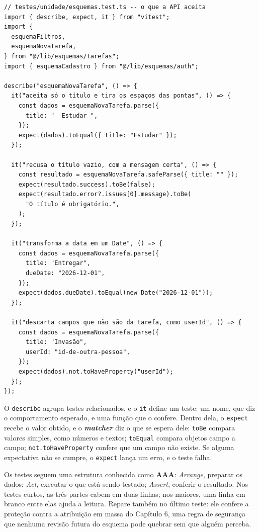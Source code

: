 \begin{codigo}
\begin{Verbatim}[breaklines=true, breaksymbolleft={}, fontsize=\footnotesize]
// testes/unidade/esquemas.test.ts -- o que a API aceita
import { describe, expect, it } from "vitest";
import {
  esquemaFiltros,
  esquemaNovaTarefa,
} from "@/lib/esquemas/tarefas";
import { esquemaCadastro } from "@/lib/esquemas/auth";

describe("esquemaNovaTarefa", () => {
  it("aceita só o título e tira os espaços das pontas", () => {
    const dados = esquemaNovaTarefa.parse({
      title: "  Estudar ",
    });
    expect(dados).toEqual({ title: "Estudar" });
  });

  it("recusa o título vazio, com a mensagem certa", () => {
    const resultado = esquemaNovaTarefa.safeParse({ title: "" });
    expect(resultado.success).toBe(false);
    expect(resultado.error?.issues[0].message).toBe(
      "O título é obrigatório.",
    );
  });

  it("transforma a data em um Date", () => {
    const dados = esquemaNovaTarefa.parse({
      title: "Entregar",
      dueDate: "2026-12-01",
    });
    expect(dados.dueDate).toEqual(new Date("2026-12-01"));
  });

  it("descarta campos que não são da tarefa, como userId", () => {
    const dados = esquemaNovaTarefa.parse({
      title: "Invasão",
      userId: "id-de-outra-pessoa",
    });
    expect(dados).not.toHaveProperty("userId");
  });
});
\end{Verbatim}
\end{codigo}

O \texttt{describe} agrupa testes relacionados, e o \texttt{it} define um teste: um nome, que diz o comportamento esperado, e uma função que o confere. Dentro dela, o \texttt{expect} recebe o valor obtido, e o \textbf{\textit{matcher}} diz o que se espera dele: \texttt{toBe} compara valores simples, como números e textos; \texttt{toEqual} compara objetos campo a campo; \texttt{not.toHaveProperty} confere que um campo não existe. Se alguma expectativa não se cumpre, o \texttt{expect} lança um erro, e o teste falha.

Os testes seguem uma estrutura conhecida como \textbf{AAA}: \textit{Arrange}, preparar os dados; \textit{Act}, executar o que está sendo testado; \textit{Assert}, conferir o resultado. Nos testes curtos, as três partes cabem em duas linhas; nos maiores, uma linha em branco entre elas ajuda a leitura. Repare também no último teste: ele confere a proteção contra a atribuição em massa do Capítulo 6, uma regra de segurança que nenhuma revisão futura do esquema pode quebrar sem que alguém perceba.

